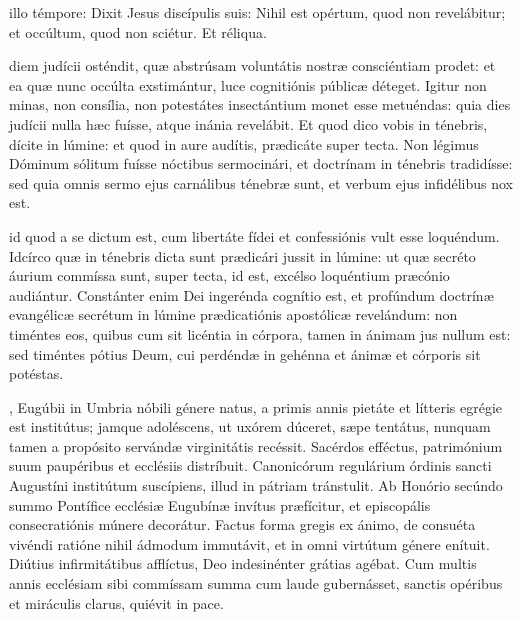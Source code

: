 \documentclass[fontsize=9pt,paper=A6,twoside,BCOR=1mm,DIV=22,headinclude]{scrarticle}
\begin{document}
\begin{multicols}{2}
\RVMTPvi 

 illo témpore: 
Dixit Jesus discípulis suis:
Nihil est opértum, quod non revelábitur; et occúltum, quod non sciétur.
Et réliqua.

 diem judícii osténdit, quæ abstrúsam voluntátis nostræ consciéntiam prodet: et ea quæ nunc occúlta exstimántur, luce cognitiónis públicæ déteget. Igitur non minas, non consília, non potestátes insectántium monet esse metuéndas: quia dies judícii nulla hæc fuísse, atque inánia revelábit. Et quod dico vobis in ténebris, dícite in lúmine: et quod in aure audítis, prædicáte super tecta. Non légimus Dóminum sólitum fuísse nóctibus sermocinári, et doctrínam in ténebris tradidísse: sed quia omnis sermo ejus carnálibus ténebræ sunt, et verbum ejus infidélibus nox est.


\RVMTPvii 

 id quod a se dictum est, cum libertáte fídei et confessiónis vult esse loquéndum. Idcírco quæ in ténebris dicta sunt prædicári jussit in lúmine: ut quæ secréto áurium commíssa sunt, super tecta, id est, excélso loquéntium præcónio audiántur. Constánter enim Dei ingerénda cognítio est, et profúndum doctrínæ evangélicæ secrétum in lúmine prædicatiónis apostólicæ revelándum: non timéntes eos, quibus cum sit licéntia in córpora, tamen in ánimam jus nullum est: sed timéntes pótius Deum, cui perdéndæ in gehénna et ánimæ et córporis sit potéstas.

\RVMTPviii 

, Eugúbii in Umbria nóbili génere natus, a primis annis pietáte et lítteris egrégie est institútus; jamque adoléscens, ut uxórem dúceret, sæpe tentátus, nunquam tamen a propósito servándæ virginitátis recéssit. Sacérdos efféctus, patrimónium suum paupéribus et ecclésiis distríbuit. Canonicórum regulárium órdinis sancti Augustíni institútum suscípiens, illud in pátriam tránstulit. Ab Honório secúndo summo Pontífice ecclésiæ Eugubínæ invítus præfícitur, et episcopális consecratiónis múnere decorátur. Factus forma gregis ex ánimo, de consuéta vivéndi ratióne nihil ádmodum immutávit, et in omni virtútum génere enítuit. Diútius infirmitátibus afflíctus, Deo indesinénter grátias agébat. Cum multis annis ecclésiam sibi commíssam summa cum laude gubernásset, sanctis opéribus et miráculis clarus, quiévit in pace.


\end{multicols}
\end{document}
